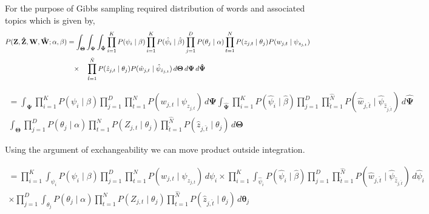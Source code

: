\documentclass[a4paper]{article}
\begin{document}
For the purpose of Gibbs sampling required distribution of words and associated topics which is given by, 
\begin{align*}
\begin{split}
P(\mathbf{Z}, \mathbf{\hat{Z}}, \mathbf{W}, \mathbf{\hat{W}} ; \alpha, \beta) &=  
\int_{\mathbf{\Theta}} \int_{\mathbf{\Psi}} \int_{\mathbf{\hat{\Psi}}} \prod_{i=1}^{K} P(\psi_{i} \mid \beta) \prod_{i=1}^{K} P(\hat{\psi}_{i} \mid \hat{\beta}) \prod_{j=1}^{D} P(\theta_{j} \mid \alpha) \prod_{t=1}^{N} P(z_{j,t} \mid \theta_{j})P(w_{j,t} \mid \psi_{z_{j,t}})\\
 & \quad \lefteqn{ \times \quad \prod_{\hat{t}=1}^{\hat{N}} P(\hat{z}_{j,t} \mid \theta_{j})P(\hat{w}_{j,t} \mid \hat{\psi}_{\hat{z}_{j,t}})\,d\mathbf{\Theta} \,d\mathbf{\Psi} \,d\mathbf{\hat{\Psi}}} \\
\end{split}
\end{align*}

\begin{multline*}
= \int_{\mathbf{\Psi}} \prod_{i=1}^{K} P(\psi_{i} \mid \beta) \prod_{j=1}^{D} \prod_{t=1}^{N}P(w_{j,t} \mid \psi_{z_{j,t}})\,d\mathbf{\Psi} \int_{\mathbf{\hat{\Psi}}} \prod_{i=1}^{K}P(\hat{\psi}_{i} \mid \hat{\beta}) \prod_{j=1}^{D} \prod_{\hat{t} =1}^{\hat{N}}P(\hat{w}_{j,\hat{t}} \mid \hat{\psi}_{\hat{z}_{j,\hat{t}}}) \,d\mathbf{\hat{\Psi}}
\\
\int_{\mathbf{\Theta}} \prod_{j=1}^{D}P(\theta_{j} \mid \alpha) \prod_{t=1}^{N} P(Z_{j,t} \mid \theta_{j})\prod_{\hat{t}=1}^{\hat{N}} P(\hat{z}_{j,\hat{t}} \mid \theta_{j})\,d\mathbf{\Theta}
\end{multline*}

Using the argument of exchangeability we can move product outside integration. 

\begin{multline*}
=\prod_{i=1}^{K}  \int_{\psi_{i}} P(\psi_{i} \mid \beta) \prod_{j=1}^{D} \prod_{t=1}^{N}P(w_{j,t} \mid \psi_{z_{j,t}})\,d\psi_{i} \times
\prod_{i=1}^{K} \int_{\hat{\psi}_{i}} P(\hat{\psi}_{i} \mid \hat{\beta}) \prod_{j=1}^{D} \prod_{\hat{t} =1}^{\hat{N}}P(\hat{w}_{j,\hat{t}} \mid \hat{\psi}_{\hat{z}_{j,\hat{t}}}) \,d\hat{\psi}_{i}\\
\times \prod_{j=1}^{D} \int_{\theta_{j}} P(\theta_{j} \mid \alpha) \prod_{t=1}^{N} P(Z_{j,t} \mid \theta_{j})\prod_{\hat{t}=1}^{\hat{N}} P(\hat{z}_{j,\hat{t}} \mid \theta_{j})\,d\mathbf{\theta_{\textit{j}}}
\end{multline*}
\end{document}
